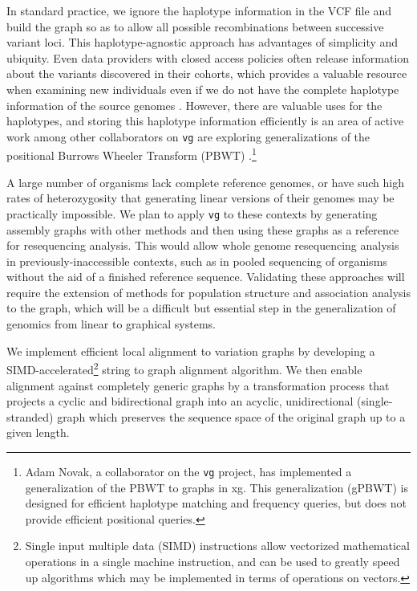 \documentclass[12pt]{article}
\begin{document}
In standard practice, we ignore the haplotype information in the VCF file and build the graph so as to allow all possible recombinations between successive variant loci.
This haplotype-agnostic approach has advantages of simplicity and ubiquity.
Even data providers with closed access policies often release information about the variants discovered in their cohorts, which provides a valuable resource when examining new individuals even if we do not have the complete haplotype information of the source genomes \cite{exac2015}.
However, there are valuable uses for the haplotypes, and storing this haplotype information efficiently is an area of active work among other collaborators on {\tt vg} are exploring generalizations of the positional Burrows Wheeler Transform (PBWT) \cite{durbin2014}.\footnote{Adam Novak, a collaborator on the {\tt vg} project, has implemented a generalization of the PBWT to graphs in xg. This generalization (gPBWT) is designed for efficient haplotype matching and frequency queries, but does not provide efficient positional queries.}

A large number of organisms lack complete reference genomes, or have such high rates of heterozygosity that generating linear versions of their genomes may be practically impossible.
We plan to apply {\tt vg} to these contexts by generating assembly graphs with other methods and then using these graphs as a reference for resequencing analysis.
This would allow whole genome resequencing analysis in previously-inaccessible contexts, such as in pooled sequencing of organisms without the aid of a finished reference sequence. 
Validating these approaches will require the extension of methods for population structure and association analysis to the graph, which will be a difficult but essential step in the generalization of genomics from linear to graphical systems.

{}



\appendix


We implement efficient local alignment to variation graphs by developing a SIMD-accelerated\footnote{Single input multiple data (SIMD) instructions allow vectorized mathematical operations in a single machine instruction, and can be used to greatly speed up algorithms which may be implemented in terms of operations on vectors.} string to graph alignment algorithm. We then enable alignment against completely generic graphs by a transformation process that projects a cyclic and bidirectional graph into an acyclic, unidirectional (single-stranded) graph which preserves the sequence space of the original graph up to a given length.
\end{document}
